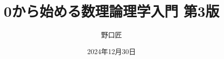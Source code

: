\documentclass[10pt, a5j, ]{ltjsbook} %
\numberwithin{equation}{section}
\theoremstyle{definition}
\renewcommand{\presectionname}{\S}
\newcommand{\presubsectionname}{\S\S}
\begin{document}
\begin{titlepage}
	\title{0から始める数理論理学入門 第3版}
	\author{野口匠}
	\date{2024年12月30日}
	\maketitle
\end{titlepage}

\frontmatter



\tableofcontents

\mainmatter








\backmatter

\RenewDocumentCommand{\presectionname}{}{}
\RenewDocumentCommand{\presubsectionname}{}{}


\nocite{*}
\printbibliography[title=参考文献, heading=bibintoc]

\printindex[sidx]
\printindex[widx]

\newpage
\pagestyle{empty}
~
\newpage
~
\newpage


\end{document}
